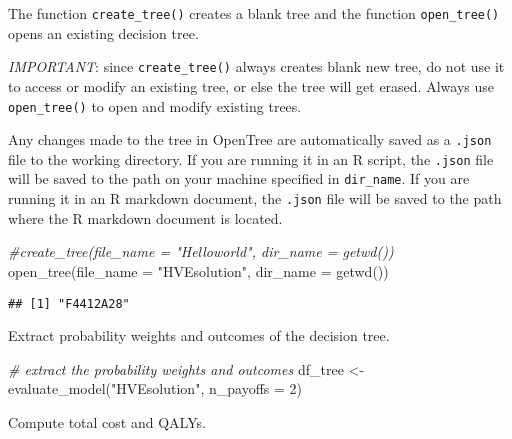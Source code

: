 \documentclass[
]{article}
\newenvironment{Shaded}{\begin{snugshade}}{\end{snugshade}}
\newcommand{\AttributeTok}[1]{\textcolor[rgb]{0.77,0.63,0.00}{#1}}
\newcommand{\CommentTok}[1]{\textcolor[rgb]{0.56,0.35,0.01}{\textit{#1}}}
\newcommand{\DecValTok}[1]{\textcolor[rgb]{0.00,0.00,0.81}{#1}}
\newcommand{\FunctionTok}[1]{\textcolor[rgb]{0.00,0.00,0.00}{#1}}
\newcommand{\NormalTok}[1]{#1}
\newcommand{\OtherTok}[1]{\textcolor[rgb]{0.56,0.35,0.01}{#1}}
\newcommand{\StringTok}[1]{\textcolor[rgb]{0.31,0.60,0.02}{#1}}
\begin{document}
The function \texttt{create\_tree()} creates a blank tree and the
function \texttt{open\_tree()} opens an existing decision tree.

\emph{IMPORTANT}: since \texttt{create\_tree()} always creates blank new
tree, do not use it to access or modify an existing tree, or else the
tree will get erased. Always use \texttt{open\_tree()} to open and
modify existing trees.

Any changes made to the tree in OpenTree are automatically saved as a
\texttt{.json} file to the working directory. If you are running it in
an R script, the \texttt{.json} file will be saved to the path on your
machine specified in \texttt{dir\_name}. If you are running it in an R
markdown document, the \texttt{.json} file will be saved to the path
where the R markdown document is located.

\begin{Shaded}
\begin{Highlighting}[]
\CommentTok{\#create\_tree(file\_name = "Helloworld", dir\_name = getwd())}
\FunctionTok{open\_tree}\NormalTok{(}\AttributeTok{file\_name =} \StringTok{"HVEsolution"}\NormalTok{, }\AttributeTok{dir\_name =} \FunctionTok{getwd}\NormalTok{())}
\end{Highlighting}
\end{Shaded}

\begin{verbatim}
## [1] "F4412A28"
\end{verbatim}

Extract probability weights and outcomes of the decision tree.

\begin{Shaded}
\begin{Highlighting}[]
\CommentTok{\# extract the probability weights and outcomes  }
\NormalTok{df\_tree }\OtherTok{\textless{}{-}} \FunctionTok{evaluate\_model}\NormalTok{(}\StringTok{"HVEsolution"}\NormalTok{, }\AttributeTok{n\_payoffs =} \DecValTok{2}\NormalTok{)}
\end{Highlighting}
\end{Shaded}

Compute total cost and QALYs.
\end{document}
